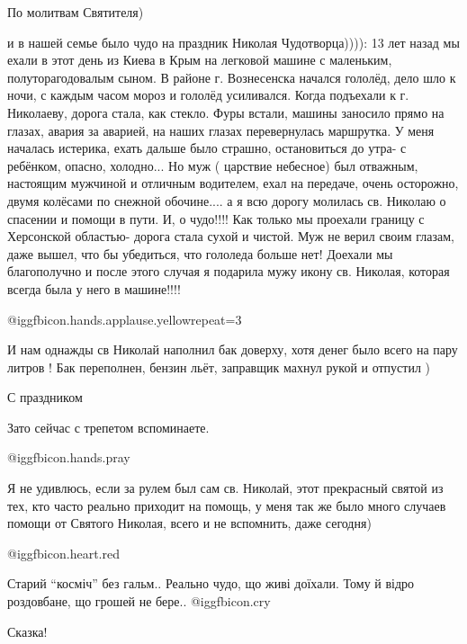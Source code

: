 \begin{itemize}
По молитвам Святителя)


и в нашей семье было чудо на праздник Николая Чудотворца)))): 13 лет назад мы
ехали в этот день из Киева в Крым на легковой машине с маленьким,
полуторагодовалым сыном. В районе г. Вознесенска начался гололёд, дело шло к
ночи, с каждым часом мороз и гололёд усиливался. Когда подъехали к г.
Николаеву, дорога стала, как стекло. Фуры встали, машины заносило прямо на
глазах, авария за аварией, на наших глазах перевернулась маршрутка. У меня
началась истерика, ехать дальше было страшно, остановиться до утра- с ребёнком,
опасно, холодно... Но муж ( царствие небесное) был отважным, настоящим мужчиной и
отличным водителем, ехал на передаче, очень осторожно, двумя колёсами по
снежной обочине.... а я всю дорогу молилась св. Николаю о спасении и помощи в
пути. И, о чудо!!!! Как только мы проехали границу с Херсонской областью-
дорога стала сухой и чистой. Муж не верил своим глазам, даже вышел, что бы
убедиться, что гололеда больше нет! Доехали мы благополучно и после этого
случая я подарила мужу икону св. Николая, которая всегда была у него в
машине!!!!


 @igg{fbicon.hands.applause.yellow}{repeat=3} 


И нам однажды св Николай наполнил бак доверху, хотя денег было всего на пару
литров ! Бак переполнен, бензин льёт, заправщик махнул рукой и отпустил )


С праздником

Зато сейчас с трепетом вспоминаете.

 @igg{fbicon.hands.pray} 


Я не удивлюсь, если за рулем был сам св. Николай, этот прекрасный святой из
тех, кто часто реально приходит на помощь, у меня так же было много случаев
помощи от Святого Николая, всего и не вспомнить, даже сегодня)

@igg{fbicon.heart.red}

Старий \enquote{косміч} без гальм..
Реально чудо, що живі доїхали.
Тому й відро роздовбане, що грошей не бере..  @igg{fbicon.cry} 

Сказка!


\end{itemize}

